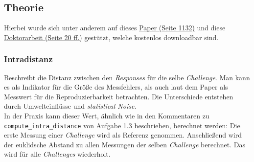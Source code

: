 \subsection{Theorie}

Hierbei wurde sich unter anderem auf dieses 
\href{https://ieeexplore.ieee.org/stamp/stamp.jsp?tp=&arnumber=6823677} 
{Paper (Seite 1132)} 
und diese 
\href{https://limo.libis.be/primo-explore/fulldisplay?docid=LIRIAS1662210&context%=L&vid=Lirias&search_scope=Lirias&tab=default_tab&lang=en_US&fromSitemap=1}
{Doktorarbeit (Seite 20 ff.)}
gestützt, welche kostenlos downloadbar sind.

\subsubsection*{Intradistanz}
\begin{comment}
VL 5, Folie 36:
Distance between responses for the same challenges. 
Shows measurements error


Doktorarbeit, S.20:
A PUF response intra-distance is a random variable
describing the distance between two PUF responses 
from the same PUF instance and using
the same challenge

Paper, S. 1132:
Intra-PUF variation: Defined as the number of bits
in a PUF response that vary when an identical
challenge is repeatedly queried on a given PUF
device in a changing environment. This variation is
due to this environmental change as well as 
statistical noise. As a result, it is commonly 
represented in the form of a statistical 
distribution. Intra-PUF variation is a measure of 
the reproducibility of responses from an individual 
PUF circuit.
\end{comment}

Beschreibt die Distanz zwischen den
\textit{Responses} für die selbe \textit{Challenge}. 
Man kann es als Indikator für die Größe des Messfehlers,
als auch laut dem Paper als Messwert für die 
Reproduzierbarkeit betrachten. Die Unterschiede entstehen 
durch Umwelteinflüsse und \textit{statistical Noise}.\\

In der Praxis kann dieser Wert, ähnlich wie in 
den Kommentaren zu \verb|compute_intra_distance| 
von Aufgabe 1.3 beschrieben, berechnet werden: Die
erste Messung einer \textit{Challenge} wird als Referenz 
genommen. Anschließend wird der euklidsche Abstand zu 
allen Messungen der selben \textit{Challenge} berechnet.
Das wird für alle \textit{Challenges} wiederholt.



